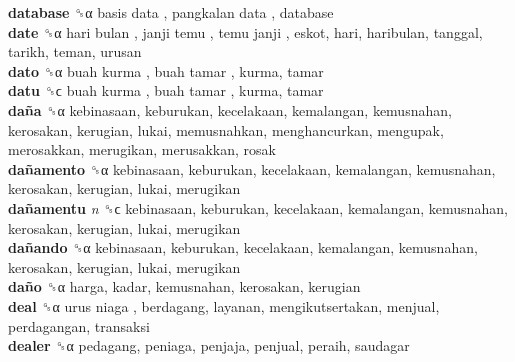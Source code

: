 \textbf{database} ␝α   basis data ,  pangkalan data , database  \\
\textbf{date} ␝α   hari bulan ,  janji temu ,  temu janji , eskot, hari, haribulan, tanggal, tarikh, teman, urusan  \\
\textbf{dato} ␝α   buah kurma ,  buah tamar , kurma, tamar  \\
\textbf{datu} ␝ϲ   buah kurma ,  buah tamar , kurma, tamar  \\
\textbf{daña} ␝α  kebinasaan, keburukan, kecelakaan, kemalangan, kemusnahan, kerosakan, kerugian, lukai, memusnahkan, menghancurkan, mengupak, merosakkan, merugikan, merusakkan, rosak  \\
\textbf{dañamento} ␝α  kebinasaan, keburukan, kecelakaan, kemalangan, kemusnahan, kerosakan, kerugian, lukai, merugikan  \\
\textbf{dañamentu} \emph{n}  ␝ϲ  kebinasaan, keburukan, kecelakaan, kemalangan, kemusnahan, kerosakan, kerugian, lukai, merugikan  \\
\textbf{dañando} ␝α  kebinasaan, keburukan, kecelakaan, kemalangan, kemusnahan, kerosakan, kerugian, lukai, merugikan  \\
\textbf{daño} ␝α  harga, kadar, kemusnahan, kerosakan, kerugian  \\
\textbf{deal} ␝α   urus niaga , berdagang, layanan, mengikutsertakan, menjual, perdagangan, transaksi  \\
\textbf{dealer} ␝α  pedagang, peniaga, penjaja, penjual, peraih, saudagar  \\
